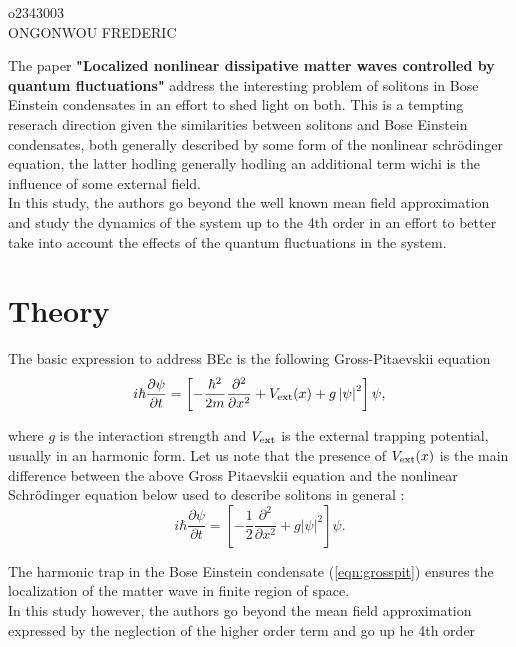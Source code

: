 \documentclass[a4paper]{article}
\begin{document}
\noindent o2343003 \\
ONGONWOU FREDERIC\\

\vspace{30pt}


The paper 
\textbf{"Localized nonlinear dissipative matter waves controlled by 
quantum fluctuations"} address the interesting problem of solitons 
in Bose Einstein condensates in an effort to shed light on both.
This is a tempting reserach direction given the similarities between 
solitons and Bose Einstein condensates, both generally described 
by some form of the nonlinear schr\"odinger equation, the latter hodling
generally hodling an additional term wichi is the influence 
of some external field. \\
In this study, the authors go beyond the well known mean field approximation 
and study the dynamics of the system up to the 4th order in an effort to better 
take into account the effects of the quantum fluctuations in the system. 

\section{Theory}

The basic expression to address BEc is the following Gross-Pitaevskii equation
\begin{equation}
i\hbar\frac{\partial \psi}{\partial t}
  = \left[ -\frac{\hbar^2}{2m}\frac{\partial^2}{\partial x^2} + V_{\rm ext}(x) 
+ g\left|\psi \right|^2
\right]\psi, \label{eqn:grosspit}
\end{equation}

\noindent where $g$ is the interaction strength and $V_{\rm ext}$ is 
the external trapping potential, usually in an harmonic form.
Let us note that the presence of $V_{\rm ext}(x)$ is the main difference 
between the above Gross Pitaevskii equation and the
nonlinear Schr\"odinger equation below used to describe solitons in general :
\begin{equation}
i\hbar\frac{\partial \psi}{\partial t} =
   \left[ -\frac{1}{2}\frac{\partial^2}{\partial x^2}
 + g\left|\psi \right|^2\right]\psi.
\end{equation}

The harmonic trap in the Bose Einstein condensate (\ref{eqn:grosspit})
ensures the localization of the matter wave in finite region of space. \\

In this study however, the authors go beyond the mean field approximation 
expressed by the neglection of the higher order term and go up he 4th order
\end{document}
